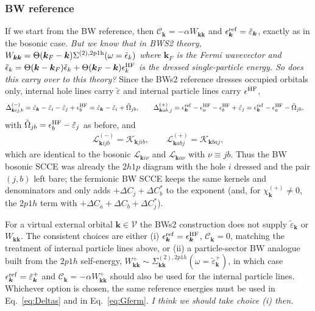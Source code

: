 \subsubsection{BW reference}
If we start from the BW reference, then $\mathcal{C}_{\bm{k}}=-\alpha W_{\bm{k}\bm{k}}$ and $\epsilon^{\rm ref}_{\bm{k}}=\tilde{\varepsilon}_{\bm{k}}$, exactly as in the bosonic case. \emph{But we know that in BWS2 theory, $W_{\bm{k}\bm{k}}=\Theta(\bm{k}_F-\bm{k})\Sigma^{(2), \rm 2p1h}(\omega=\tilde{\epsilon}_k)$ where $\bm{k}_F$ is the Fermi wavevector and $\tilde{\epsilon}_k=\Theta(\bm{k}-\bm{k}_F)\tilde{\epsilon}_k + \Theta(\bm{k}_F-\bm{k})\epsilon^{\rm HF}_k$ is the dressed single-particle energy. So does this carry over to this theory?} Since the BWs2 reference dresses occupied orbitals only, internal hole lines carry $\tilde{\varepsilon}$ and internal particle lines carry $\epsilon^{\rm HF}$,
\begin{align}
\Delta^{(-)}_{\bm{k}ij,b}
&=
\tilde{\varepsilon}_{\bm{k}}
-\tilde{\varepsilon}_{i}
-\tilde{\varepsilon}_{j}
+\epsilon^{\rm HF}_{b}
=
\tilde{\varepsilon}_{\bm{k}}-\tilde{\varepsilon}_{i}+\tilde{\Omega}_{jb},
\qquad
\Delta^{(+)}_{\bm{k}ab,j}
=
\epsilon^{\rm ref}_{\bm{k}}
-\epsilon^{\rm HF}_{a}
-\epsilon^{\rm HF}_{b}
+\tilde{\varepsilon}_{j}
=
\epsilon^{\rm ref}_{\bm{k}}-\epsilon^{\rm HF}_a-\tilde{\Omega}_{jb},
\end{align}
with $\tilde{\Omega}_{jb}=\epsilon^{\rm HF}_b-\tilde{\varepsilon}_j$ as before, and
\begin{align}
\mathcal{L}^{(-)}_{\bm{k}ijb}=\mathcal{K}_{\bm{k}jib},
\qquad
\mathcal{L}^{(+)}_{\bm{k}abj}=\mathcal{K}_{\bm{k}baj},
\end{align}
which are identical to the bosonic $\mathcal{L}_{\bm{k}i\nu}$ and $\mathcal{L}_{\bm{k}a\nu}$ with $\nu\equiv jb$. Thus the BW bosonic SCCE was already the $2h1p$ diagram with the hole $i$ dressed and the pair $(j,b)$ left bare; the fermionic BW SCCE keeps the same kernels and denominators and only adds $+\Delta C_j+\Delta C_b^*$ to the exponent (and, for $\chi^{(+)}_{\bm k}\neq0$, the $2p1h$ term with $+\Delta C_a+\Delta C_b+\Delta C_j^*$).

For a virtual external orbital $\bm{k}\in\mathcal{V}$ the BWs2 construction does not supply $\tilde{\varepsilon}_{\bm{k}}$ or $W_{\bm{k}\bm{k}}$. The consistent choices are either (i) $\epsilon^{\rm ref}_{\bm{k}}=\epsilon^{\rm HF}_{\bm{k}}$, $\mathcal{C}_{\bm{k}}=0$, matching the treatment of internal particle lines above, or (ii) a particle-sector BW analogue built from the $2p1h$ self-energy, $W^{+}_{\bm{k}\bm{k}}\sim\Sigma^{(2),2p1h}_{\bm{k}\bm{k}}(\omega=\tilde{\varepsilon}^{+}_{\bm{k}})$, in which case $\epsilon^{\rm ref}_{\bm{k}}=\tilde{\varepsilon}^{+}_{\bm{k}}$ and $\mathcal{C}_{\bm{k}}=-\alpha W^{+}_{\bm{k}\bm{k}}$ should also be used for the internal particle lines. Whichever option is chosen, the same reference energies must be used in Eq.~\eqref{eq:Deltas} and in Eq.~\eqref{eq:Gferm}. \emph{I think we should take choice (i) then.}


